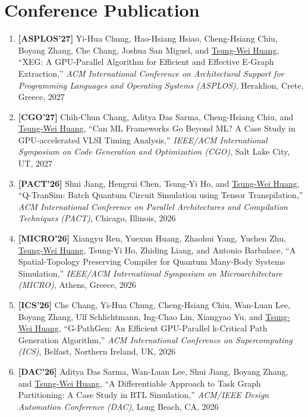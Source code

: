 \documentclass[A4,11pt]{article}
\begin{document}
\section{Conference Publication}
 \begin{enumerate}
 \itemsep-3pt
    
    \item \textbf{[ASPLOS'27]} Yi-Hua Chung, Hao-Hsiang Hsiao, Cheng-Hsiang Chiu, Boyang Zhang, Che Chang, Joshua San Miguel, and \underline{Tsung-Wei Huang}, ``XEG: A GPU-Parallel Algorithm for Efficient and Effective E-Graph Extraction,'' \textit{ACM International Conference on Architectural Support for Programming Languages and Operating Systems (ASPLOS)}, Heraklion, Crete, Greece, 2027
    
    \item \textbf{[CGO'27]} Chih-Chun Chang, Aditya Das Sarma, Cheng-Hsiang Chiu, and \underline{Tsung-Wei Huang}, ``Can ML Frameworks Go Beyond ML? A Case Study in GPU-accelerated VLSI Timing Analysis,'' \textit{IEEE/ACM International Symposium on Code Generation and Optimization (CGO)}, Salt Lake City, UT, 2027

    \item \textbf{[PACT'26]} Shui Jiang, Hengrui Chen, Tsung-Yi Ho, and \underline{Tsung-Wei Huang}, ``Q-TranSim: Batch Quantum Circuit Simulation using Tensor Transpilation,'' \textit{ACM International Conference on Parallel Architectures and Compilation Techniques (PACT)}, Chicago, Illinois, 2026

    \item \textbf{[MICRO'26]} Xiangyu Ren, Yuexun Huang, Zhaohui Yang, Yuchen Zhu, \underline{Tsung-Wei Huang}, Tsung-Yi Ho, Zhiding Liang, and Antonio Barbalace, ``A Spatial-Topology Preserving Compiler for Quantum Many-Body Systems Simulation,'' \textit{IEEE/ACM International Symposium on Microarchitecture (MICRO)}, Athens, Greece, 2026
    
    \item \textbf{[ICS'26]} Che Chang, Yi-Hua Chung, Cheng-Hsiang Chiu, Wan-Luan Lee, Boyang Zhang, Ulf Schlichtmann, Ing-Chao Lin, Xiangyao Yu, and \underline{Tsung-Wei Huang}, ``G-PathGen: An Efficient GPU-Parallel k-Critical Path Generation Algorithm,'' \textit{ACM International Conference on Supercomputing (ICS)}, Belfast, Northern Ireland, UK, 2026
    
    \item \textbf{[DAC'26]} Aditya Das Sarma, Wan-Luan Lee, Shui Jiang, Boyang Zhang, and \underline{Tsung-Wei Huang}, ``A Differentiable Approach to Task Graph Partitioning: A Case Study in RTL Simulation,'' \textit{ACM/IEEE Design Automation Conference (DAC)}, Long Beach, CA, 2026
    

\end{enumerate}
\end{document}

